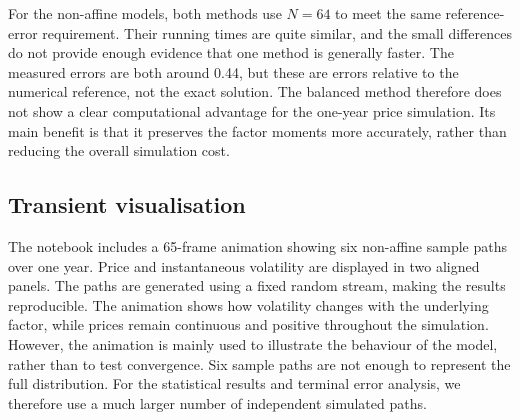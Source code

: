 For the non-affine models, both methods use $N=64$ to meet the same reference-error requirement. Their running times are quite similar, and the small differences do not provide enough evidence that one method is generally faster. The measured errors are both around 0.44, but these are errors relative to the numerical reference, not the exact solution. The balanced method therefore does not show a clear computational advantage for the one-year price simulation. Its main benefit is that it preserves the factor moments more accurately, rather than reducing the overall simulation cost.

\subsection{Transient visualisation}
The notebook includes a 65-frame animation showing six non-affine sample paths over one year. Price and instantaneous volatility are displayed in two aligned panels. The paths are generated using a fixed random stream, making the results reproducible. The animation shows how volatility changes with the underlying factor, while prices remain continuous and positive throughout the simulation. However, the animation is mainly used to illustrate the behaviour of the model, rather than to test convergence. Six sample paths are not enough to represent the full distribution. For the statistical results and terminal error analysis, we therefore use a much larger number of independent simulated paths.

